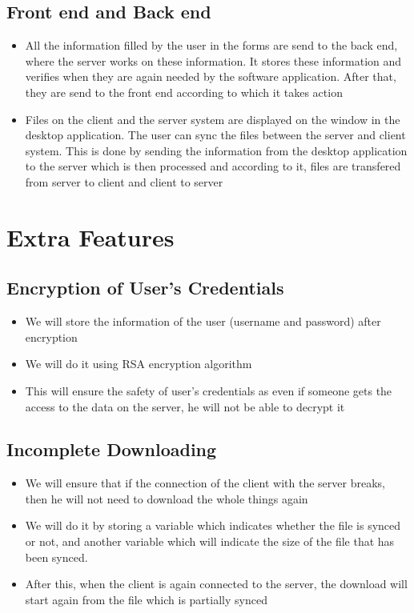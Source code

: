 \documentclass{article}
\begin{document}
		\subsection{Front end and Back end}
			\begin{itemize}
				\item All the information filled by the user in the forms are send to the back end, where the server works on these information. It stores these information and verifies when they are again needed by the software application. After that, they are send to the front end according to which it takes action
				\item Files on the client and the server system are displayed on the window in the desktop application. The user can sync the files between the server and client system. This is done by sending the information from the desktop application to the server which is then processed and according to it, files are transfered from server to client and client to server
			\end{itemize}
	\section{Extra Features}
		\subsection{Encryption of User's Credentials}
			\begin{itemize}
				\item We will store the information of the user (username and password) after encryption
				\item We will do it using RSA encryption algorithm
				\item This will ensure the safety of user's credentials as even if someone gets the access to the data on the server, he will not be able to decrypt it
			\end{itemize}
		\subsection{Incomplete Downloading}
			\begin{itemize}
				\item We will ensure that if the connection of the client with the server breaks, then he will not need to download the whole things again
				\item We will do it by storing a variable which indicates whether the file is synced or not, and another variable which will indicate the size of the file that has been synced. 
				\item After this, when the client is again connected to the server, the download will start again from the file which is partially synced
			\end{itemize}
\end{document}
